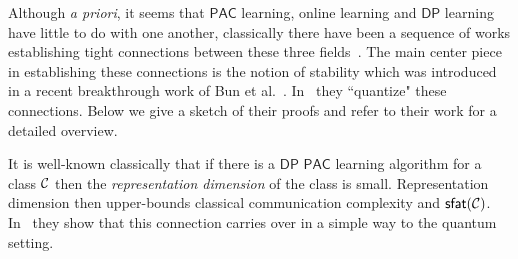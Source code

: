 \documentclass[11pt]{article}
\newcommand{\sfat}{\ensuremath{\mathsf{sfat}}}
\newcommand{\DP}{\ensuremath{\mathsf{DP}}}
\newcommand{\PAC}{\ensuremath{\mathsf{PAC}}}
\newcommand{\calC}{{\cal C }}
\begin{document}
\begin{figure}[!ht]
\centering
{}
\end{figure}
Although  {\em a priori}, it seems that $\PAC$ learning, online learning and $\DP$ learning have little to do with one another, classically there have been a sequence of works establishing tight connections between these three fields~\cite{DBLP:journals/siamcomp/KasiviswanathanLNRS11}. The main center piece in establishing these connections is the notion of stability which was introduced in a recent breakthrough work of Bun et al.~\cite{DBLP:conf/focs/BunLM20}. In~\cite{DBLP:conf/nips/QuekAS21} they ``quantize" these connections. Below we give a sketch of their proofs and refer to their work for a detailed overview. 

It is well-known classically that if there is a $\DP$ $\PAC$ learning algorithm for a class $\calC$ then the \emph{representation dimension} of the class is small. Representation dimension then upper-bounds classical communication complexity and $\sfat(\calC)$. In~\cite{DBLP:conf/nips/QuekAS21} they show that this connection carries over in a simple way to the quantum setting.  
\end{document}
